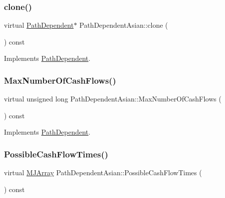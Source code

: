 \hypertarget{classPathDependentAsian_a39a39fccbdf2ea9aad07ad8152b768d5}{}\label{classPathDependentAsian_a39a39fccbdf2ea9aad07ad8152b768d5} 
\subsubsection{\texorpdfstring{clone()}{clone()}}
{\footnotesize\ttfamily virtual \hyperlink{classPathDependent}{Path\+Dependent}$\ast$ Path\+Dependent\+Asian\+::clone (\begin{DoxyParamCaption}{ }\end{DoxyParamCaption}) const\hspace{0.3cm}{\ttfamily [virtual]}}



Implements \hyperlink{classPathDependent_afcc10647f591175642c6dc0adba23f0b}{Path\+Dependent}.

\hypertarget{classPathDependentAsian_af11d1140df3f2ab8e9f9ccc5f3eb4d73}{}\label{classPathDependentAsian_af11d1140df3f2ab8e9f9ccc5f3eb4d73} 
\subsubsection{\texorpdfstring{Max\+Number\+Of\+Cash\+Flows()}{MaxNumberOfCashFlows()}}
{\footnotesize\ttfamily virtual unsigned long Path\+Dependent\+Asian\+::\+Max\+Number\+Of\+Cash\+Flows (\begin{DoxyParamCaption}{ }\end{DoxyParamCaption}) const\hspace{0.3cm}{\ttfamily [virtual]}}



Implements \hyperlink{classPathDependent_a1ee091a4f3680339683af087dfb4ca0f}{Path\+Dependent}.

\hypertarget{classPathDependentAsian_a58d4f5ddfc26c3c8eeefddd3834525f6}{}\label{classPathDependentAsian_a58d4f5ddfc26c3c8eeefddd3834525f6} 
\subsubsection{\texorpdfstring{Possible\+Cash\+Flow\+Times()}{PossibleCashFlowTimes()}}
{\footnotesize\ttfamily virtual \hyperlink{classMJArray}{M\+J\+Array} Path\+Dependent\+Asian\+::\+Possible\+Cash\+Flow\+Times (\begin{DoxyParamCaption}{ }\end{DoxyParamCaption}) const\hspace{0.3cm}{\ttfamily [virtual]}}



